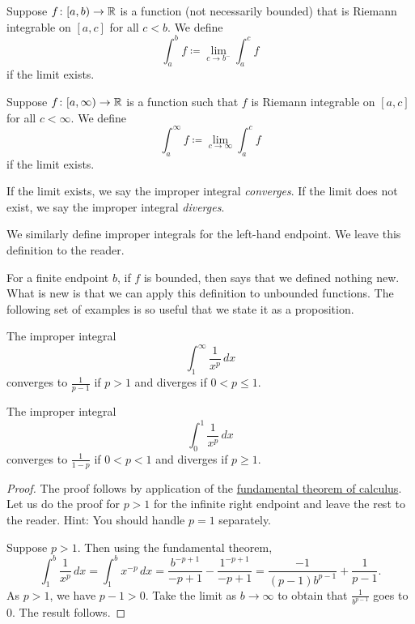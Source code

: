 \begin{defn}
Suppose $f \colon [a,b) \to {\mathbb{R}}$ is a function (not necessarily bounded)
that is Riemann integrable on $[a,c]$ for all $c < b$.  We define
\begin{equation*}
\int_a^b f \coloneqq \lim_{c \to b^-} \int_a^{c} f
\end{equation*}
if the limit exists.

Suppose $f \colon [a,\infty) \to {\mathbb{R}}$ is a function such that
$f$ is Riemann integrable on $[a,c]$ for all $c < \infty$.  
We define
\begin{equation*}
\int_a^\infty f \coloneqq \lim_{c \to \infty} \int_a^c f
\end{equation*}
if the limit exists.

If the limit exists, we say the improper integral
\emph{converges}.
If the limit does not exist, we say the improper integral
\emph{diverges}.

We similarly define improper integrals for the left-hand endpoint.
We leave this definition to the reader.
\end{defn}

For a finite endpoint $b$, if $f$ is bounded,
then
 says that we defined nothing new.  What is new is that
we can apply this definition to unbounded functions.
The following set of examples is
so useful that we state it as a proposition.

\begin{prop}%
\label{impropriemann:ptest}
The improper integral
\begin{equation*}
\int_1^\infty \frac{1}{x^p} \,dx
\end{equation*}
converges to $\frac{1}{p-1}$ if $p > 1$ and diverges if $0 < p \leq 1$.

The improper integral
\begin{equation*}
\int_0^1 \frac{1}{x^p} \,dx
\end{equation*}
converges to $\frac{1}{1-p}$ if $0 < p < 1$ and diverges if $p \geq 1$.
\end{prop}

\begin{proof}
The proof follows by application of the
\hyperref[thm:FTCv1]{fundamental theorem of calculus}.
Let us do the proof for $p > 1$ for the infinite right endpoint and
leave the rest to the reader.  Hint: You should handle $p=1$
separately.

Suppose $p > 1$.  Then
using the fundamental theorem,
\begin{equation*}
\int_1^b \frac{1}{x^p} \,dx
=
\int_1^b x^{-p} \,dx
=
\frac{b^{-p+1}}{-p+1}
-
\frac{1^{-p+1}}{-p+1}
=
\frac{-1}{(p-1)b^{p-1}}
+
\frac{1}{p-1} .
\end{equation*}
As $p > 1$, we have $p-1 > 0$.  Take the limit as $b \to \infty$
to obtain that $\frac{1}{b^{p-1}}$ goes to 0.  The result follows.
\end{proof}

